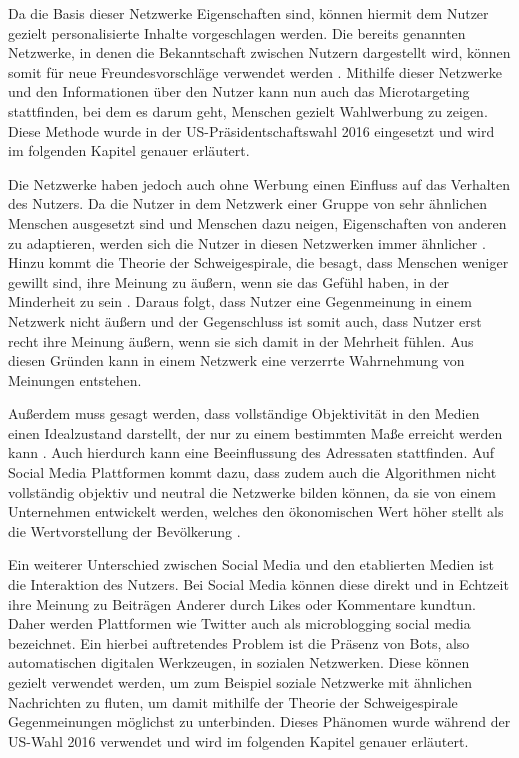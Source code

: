 Da die Basis dieser Netzwerke Eigenschaften sind, können hiermit dem Nutzer gezielt personalisierte Inhalte vorgeschlagen werden. Die bereits genannten Netzwerke, in denen die Bekanntschaft zwischen Nutzern dargestellt wird, können somit für neue Freundesvorschläge verwendet werden \autocite[vgl.][314]{socialmediamining}. Mithilfe dieser Netzwerke und den Informationen über den Nutzer kann nun auch das Microtargeting stattfinden, bei dem es darum geht, Menschen gezielt Wahlwerbung zu zeigen. Diese Methode wurde in der US-Präsidentschaftswahl 2016 eingesetzt und wird im folgenden Kapitel genauer erläutert.

Die Netzwerke haben jedoch auch ohne Werbung einen Einfluss auf das Verhalten des Nutzers. Da die Nutzer in dem Netzwerk einer Gruppe von sehr ähnlichen Menschen ausgesetzt sind und Menschen dazu neigen, Eigenschaften von anderen zu adaptieren, werden sich die Nutzer in diesen Netzwerken immer ähnlicher \autocite[vgl.][285]{socialmediamining}. Hinzu kommt die Theorie der Schweigespirale, die besagt, dass Menschen weniger gewillt sind, ihre Meinung zu äußern, wenn sie das Gefühl haben, in der Minderheit zu sein \autocite[vgl.][1]{hampton2014social}. Daraus folgt, dass Nutzer eine Gegenmeinung in einem Netzwerk nicht äußern und der Gegenschluss ist somit auch, dass Nutzer erst recht ihre Meinung äußern, wenn sie sich damit in der Mehrheit fühlen. Aus diesen Gründen kann in einem Netzwerk eine verzerrte Wahrnehmung von Meinungen entstehen. 

Außerdem muss gesagt werden, dass vollständige Objektivität in den Medien einen Idealzustand darstellt, der nur zu einem bestimmten Maße erreicht werden kann \autocite[vgl.][]{journalismusobjektivitaet}. Auch hierdurch kann eine Beeinflussung des Adressaten stattfinden. Auf Social Media Plattformen kommt dazu, dass zudem auch die Algorithmen nicht vollständig objektiv und neutral die Netzwerke bilden können, da sie von einem Unternehmen entwickelt werden, welches den ökonomischen Wert höher stellt als die Wertvorstellung der Bevölkerung \autocite[vgl.][3]{martini2017algorithmen}.

Ein weiterer Unterschied zwischen Social Media und den etablierten Medien ist die Interaktion des Nutzers. Bei Social Media können diese direkt und in Echtzeit ihre Meinung zu Beiträgen Anderer durch Likes oder Kommentare kundtun. Daher werden Plattformen wie Twitter auch als \glqq microblogging social media\grqq{} bezeichnet. Ein hierbei auftretendes Problem ist die Präsenz von Bots, also automatischen digitalen Werkzeugen, in sozialen Netzwerken. Diese können gezielt verwendet werden, um zum Beispiel soziale Netzwerke mit ähnlichen Nachrichten zu fluten, um damit mithilfe der Theorie der Schweigespirale Gegenmeinungen möglichst zu unterbinden. Dieses Phänomen wurde während der US-Wahl 2016 verwendet und wird im folgenden Kapitel genauer erläutert.


